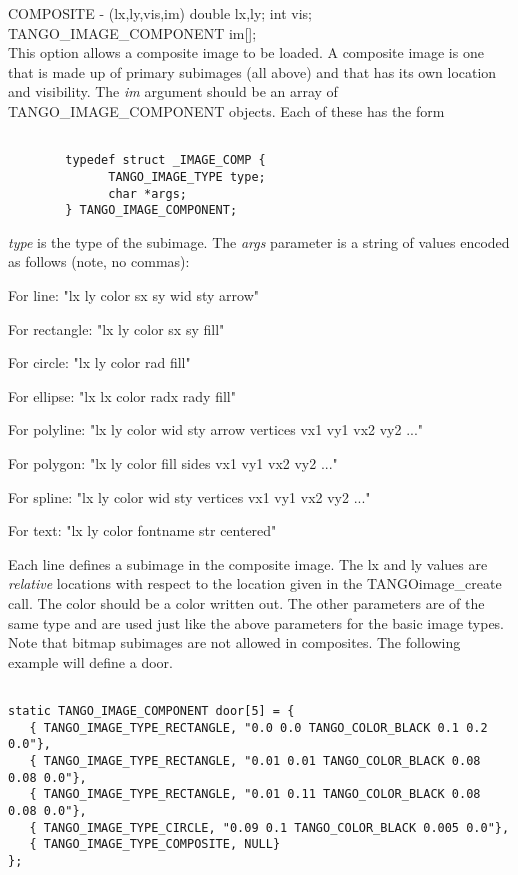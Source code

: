 COMPOSITE - (lx,ly,vis,im) double lx,ly; int vis; TANGO\_IMAGE\_COMPONENT im[];\\
This option allows a composite image to be loaded.  A composite image
is one that is made up of primary subimages (all above) and that has
its  own location and visibility.  The {\em im} argument should be an
array of TANGO\_IMAGE\_COMPONENT objects.  Each of these has the form

\begin{verbatim}

        typedef struct _IMAGE_COMP {
              TANGO_IMAGE_TYPE type;
              char *args;
        } TANGO_IMAGE_COMPONENT;

\end{verbatim}

{\em type} is the type of the subimage.  The {\em args} parameter is a
string of values encoded as follows (note, no commas):

For line: "lx ly color sx sy wid sty arrow"

For rectangle: "lx ly color sx sy fill"

For circle: "lx ly color rad fill"

For ellipse: "lx lx color radx rady fill"

For polyline: "lx ly color wid sty arrow vertices vx1 vy1 vx2 vy2 ..."

For polygon: "lx ly color fill sides vx1 vy1 vx2 vy2 ..."

For spline: "lx ly color wid sty vertices vx1 vy1 vx2 vy2 ..."

For text: "lx ly color fontname str centered"

Each line defines a subimage in the composite image.  The lx and ly values
are {\em relative} locations with respect to the location given in the
TANGOimage\_create call.  The color should be a color written out.  The other
parameters are of the same type and are used just like the above parameters
for the basic image types.  Note that bitmap subimages are not allowed
in composites.  The following example will define a door.

\begin{verbatim}

static TANGO_IMAGE_COMPONENT door[5] = {
   { TANGO_IMAGE_TYPE_RECTANGLE, "0.0 0.0 TANGO_COLOR_BLACK 0.1 0.2 0.0"},
   { TANGO_IMAGE_TYPE_RECTANGLE, "0.01 0.01 TANGO_COLOR_BLACK 0.08 0.08 0.0"},
   { TANGO_IMAGE_TYPE_RECTANGLE, "0.01 0.11 TANGO_COLOR_BLACK 0.08 0.08 0.0"},
   { TANGO_IMAGE_TYPE_CIRCLE, "0.09 0.1 TANGO_COLOR_BLACK 0.005 0.0"},
   { TANGO_IMAGE_TYPE_COMPOSITE, NULL}
};

\end{verbatim}

